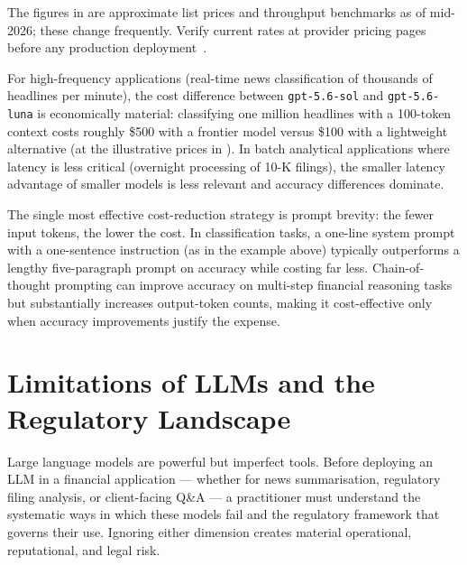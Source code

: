 \begin{deepdive}
\begin{remark}
The figures in  are approximate list prices and throughput benchmarks as of mid-2026; these change frequently. Verify current rates at provider pricing pages before any production deployment~\citep{anthropic2025api}.
\end{remark}

For high-frequency applications (real-time news classification of thousands
of headlines per minute), the cost difference between \texttt{gpt-5.6-sol}
and \texttt{gpt-5.6-luna} is economically material: classifying one million
headlines with a 100-token context costs roughly \$500 with a frontier model versus \$100 with a lightweight alternative (at the illustrative prices in ).  In
batch analytical applications where latency is less critical (overnight
processing of 10-K filings), the smaller latency advantage of smaller
models is less relevant and accuracy differences dominate.

\begin{remark}
\label{rem:prompt-engineering}
The single most effective cost-reduction strategy is prompt brevity: the
fewer input tokens, the lower the cost.  In classification tasks, a one-line
system prompt with a one-sentence instruction (as in the example above)
typically outperforms a lengthy five-paragraph
prompt on accuracy while costing far less.  Chain-of-thought prompting
\cite{wei2022chain}
can improve accuracy on multi-step financial reasoning tasks but substantially increases
output-token counts, making it cost-effective only when accuracy improvements
justify the expense.
\end{remark}

\end{deepdive}

\section{Limitations of LLMs and the Regulatory Landscape}
\label{sec:llm-limitations}

\begin{context}
Large language models are powerful but imperfect tools.  Before deploying
an LLM in a financial application — whether for news summarisation,
regulatory filing analysis, or client-facing Q\&A — a practitioner must
understand the systematic ways in which these models fail and the
regulatory framework that governs their use.  Ignoring either dimension
creates material operational, reputational, and legal risk.
\end{context}

